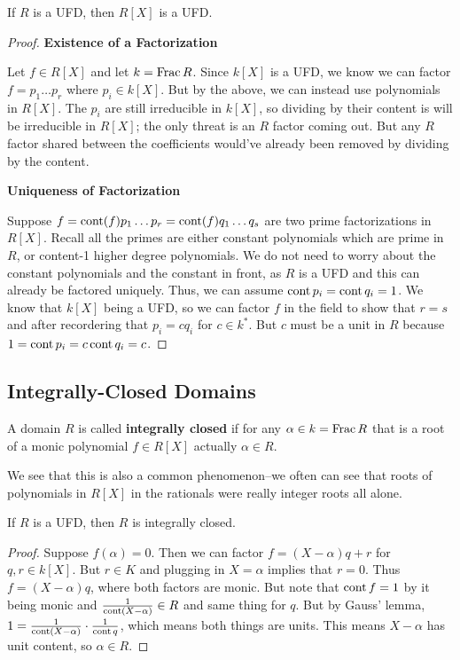 \begin{theorem}
    If $R$ is a UFD, then $R[X]$ is a UFD.
    \begin{proof}
        \textbf{Existence of a Factorization}

        Let $f \in R[X]$ and let $k = \operatorname{Frac} R$. Since $k[X]$ is a UFD,
        we know we can factor $f = p_1 \dots p_r$ where $p_i \in k[X]$. But by the above,
        we can instead use polynomials in $R[X]$. The $p_i$ are still irreducible in $k[X]$, so dividing by their content
        is will be irreducible in $R[X]$; the only threat is an $R$ factor coming out. But any $R$ factor shared between
        the coefficients would've already been removed by dividing by the content.

        \textbf{Uniqueness of Factorization}

        Suppose $f = \operatorname{cont}(f) p_1 \dots p_r = \operatorname{cont}(f) q_1 \dots q_s$ are two prime factorizations in $R[X]$.
        Recall all the primes are either constant polynomials which are prime in $R$, or content-1 higher degree polynomials.
        We do not need to worry about the constant polynomials and the constant in front, as $R$ is a UFD and this can already be factored
        uniquely. Thus, we can assume $\operatorname{cont} p_i = \operatorname{cont} q_i = 1$. We know that $k[X]$ being a UFD, so
        we can factor $f$ in the field to show that $r = s$ and after recordering that $p_i = cq_i$ for $c \in k^*$. But
        $c$ must be a unit in $R$ because $1 = \operatorname{cont} p_i = c \operatorname{cont} q_i = c$.
    \end{proof}
\end{theorem}

\subsection{Integrally-Closed Domains}
\begin{definition}
    A domain $R$ is called \textbf{integrally closed} if for any $\alpha \in k = \operatorname{Frac} R$ that is a root
    of a monic polynomial $f \in R[X]$ actually $\alpha \in R$.
\end{definition}
We see that this is also a common phenomenon--we often can see that roots of polynomials in $R[X]$ in the rationals
were really integer roots all alone.
\begin{theorem}
    If $R$ is a UFD, then $R$ is integrally closed.
    \begin{proof}
        Suppose $f(\alpha) = 0$. Then we can factor $f = (X - \alpha) q + r$ for $q, r \in k[X]$. But $r \in K$ and
        plugging in $X = \alpha$ implies that $r = 0$. Thus $f = (X - \alpha) q$,
        where both factors are monic. But note that $\operatorname{cont} f = 1$ by it being monic
        and $\frac{1}{\operatorname{cont} (X - \alpha)} \in R$ and same thing for $q$. But by Gauss' lemma, $1 = \frac{1}{\operatorname{cont} (X - \alpha)} \cdot \frac{1}{\operatorname{cont} q}$,
        which means both things are units. This means $X-\alpha$ has unit content, so $\alpha \in R$.
    \end{proof}
\end{theorem}

